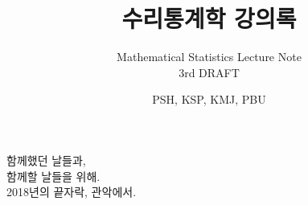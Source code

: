 \documentclass[graybox,envcountchap,envcountsame,sectrefs,fleqn]{svmono}
\begin{document}
\author{PSH, KSP, KMJ, PBU}
\title{수리통계학 강의록}
\subtitle{Mathematical Statistics Lecture Note\\{\normalsize 3rd DRAFT}}
\maketitle

\frontmatter%

\extrachap{$ $}

\begin{flushright}
함께했던 날들과,\\
함께할 날들을 위해.\\
2018년의 끝자락, 관악에서.
\end{flushright}

\end{document}
